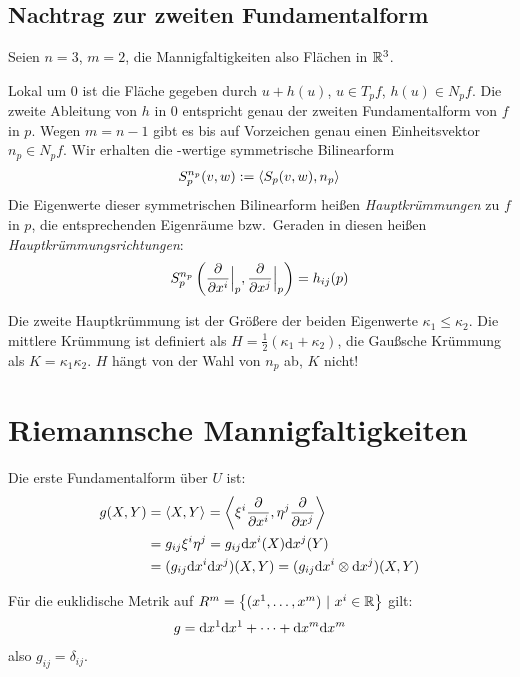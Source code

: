 \documentclass{skript}
\begin{document}
\subsection{Nachtrag zur zweiten Fundamentalform}
Seien $n=3$, $m=2$, die Mannigfaltigkeiten also Flächen in $\mathbb{R}^3$.

Lokal um $0$ ist die Fläche gegeben durch $u + h(u)$, $u\in T_pf$, $h(u)\in
N_pf$. Die zweite Ableitung von $h$ in $0$ entspricht genau der zweiten
Fundamentalform von $f$ in $p$. Wegen $m = n - 1$ gibt es bis auf Vorzeichen
genau einen Einheitsvektor $n_p \in N_pf$. Wir erhalten die \R-wertige
symmetrische Bilinearform
\begin{align*}
  S_p^{n_p}(v,w) := \sprod{S_p(v,w), n_p}
\end{align*}
Die Eigenwerte dieser symmetrischen Bilinearform heißen \emph{Hauptkrümmungen}
zu $f$ in $p$, die entsprechenden Eigenräume bzw.\ Geraden in diesen heißen
\emph{Hauptkrümmungsrichtungen}:
\begin{align*}
  S_p^{n_p}\left(\del{i}\Big|_p, \del{j}\Big|_p\right) = h_{ij}(p)
\end{align*}

Die zweite Hauptkrümmung ist der Größere der beiden Eigenwerte $\kappa_1 \le
\kappa_2$. Die mittlere Krümmung ist definiert als $H = \frac12(\kappa_1 +
\kappa_2)$, die Gaußsche Krümmung als $K = \kappa_1\kappa_2$. $H$ hängt von der
Wahl von $n_p$ ab, $K$ nicht!


\section{Riemannsche Mannigfaltigkeiten}
Die erste Fundamentalform über $U$ ist:
\begin{align*}
  g(X, Y) &= \sprod{X,Y} = \sprod{\xi^i\frac{\partial}{\partial
  x^i},\eta^j\frac{\partial}{\partial x^j}} \\
  &= g_{ij}\xi^i\eta^j = g_{ij}\d x^i(X)\d x^j(Y) \\
  &= (g_{ij}\d x^i\d x^j)(X,Y) = (g_{ij}\d x^i \otimes \d x^j)(X,Y)
\end{align*}

Für die euklidische Metrik auf $R^m = \mdef[(x^1,\ldots,x^m)]{x^i\in \R}$ gilt:
\begin{align*}
  g = \mathrm d x^1 \mathrm d x^1 + \cdots + \mathrm d x^m\mathrm d x^m
\end{align*}
also $g_{ij} = \delta_{ij}$.
\end{document}
